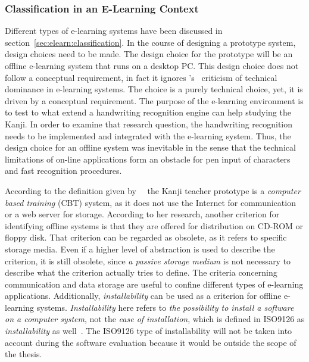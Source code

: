 \subsubsection{Classification in an E-Learning Context}
\label{sec:concept:classificationinelearning}

Different types of e-learning systems have been discussed in 
section~\ref{sec:elearn:classification}. In the course of designing a prototype 
system, design choices need to be made.
The design choice for the prototype will be an offline e-learning system that 
runs on a desktop PC.
This design choice does not follow a conceptual requirement, in fact it ignores
's~\citeyear{Ivashin2009} criticism of technical 
dominance in e-learning systems. The choice is a purely technical choice, 
yet, it is driven by a conceptual requirement.
The purpose of the e-learning environment is to test to what extend a handwriting
recognition engine can help studying the Kanji. In order to examine that 
research question, the handwriting recognition needs to be implemented and 
integrated with the e-learning system. 
Thus, the design choice for an offline system was inevitable in the sense that 
the technical limitations of on-line applications form an obstacle for pen 
input of characters and fast recognition procedures.

According to the definition given 
by~~\citeyear{Richert2007} the Kanji teacher 
prototype is a \emph{computer based training} (CBT) system, as it does not use 
the Internet for communication or a web server for storage. 
According to her research, another criterion for identifying offline systems 
is that they are offered for distribution on CD-ROM or floppy disk.
That criterion can be regarded as obsolete, as it refers to specific storage 
media. Even if a higher level of abstraction is used to describe the
criterion, it is still obsolete, since \emph{a passive storage medium} is not 
necessary to describe what the criterion actually tries to define.
The criteria concerning communication and data storage are useful to confine
different types of e-learning applications.
Additionally, \emph{installability} can be used as a criterion for offline 
e-learning systems. \emph{Installability} here refers to 
\emph{the possibility to install a software on a computer system}, 
not the \emph{ease of installation}, 
which is defined in ISO9126 as \emph{installability} as 
well~. The ISO9126 type of installability will not be taken 
into account during the software evaluation because it would be outside the 
scope of the thesis.

